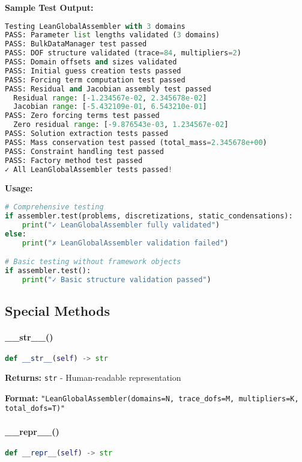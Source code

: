 \textbf{Sample Test Output:}
\begin{lstlisting}[language=Python, caption=Sample Test Output]
Testing LeanGlobalAssembler with 3 domains
PASS: Parameter list lengths validated (3 domains)
PASS: BulkDataManager test passed
PASS: DOF structure validated (trace=84, multipliers=2)
PASS: Domain offsets and sizes validated
PASS: Initial guess creation tests passed
PASS: Forcing term computation test passed
PASS: Residual and Jacobian assembly test passed
  Residual range: [-1.234567e-02, 2.345678e-02]
  Jacobian range: [-5.432109e-01, 6.543210e-01]
PASS: Zero forcing terms test passed
  Zero residual range: [-9.876543e-03, 1.234567e-02]
PASS: Solution extraction tests passed
PASS: Mass conservation test passed (total_mass=2.345678e+00)
PASS: Constraint handling test passed
PASS: Factory method test passed
✓ All LeanGlobalAssembler tests passed!
\end{lstlisting}

\textbf{Usage:}
\begin{lstlisting}[language=Python, caption=Test Usage]
# Comprehensive testing
if assembler.test(problems, discretizations, static_condensations):
    print("✓ LeanGlobalAssembler fully validated")
else:
    print("✗ LeanGlobalAssembler validation failed")

# Basic testing without framework objects
if assembler.test():
    print("✓ Basic structure validation passed")
\end{lstlisting}

\subsection{Special Methods}
\label{subsec:special_methods}

\paragraph{\_\_str\_\_()}\leavevmode
\begin{lstlisting}[language=Python, caption=String Representation Method]
def __str__(self) -> str
\end{lstlisting}

\textbf{Returns:} \texttt{str} - Human-readable representation

\textbf{Format:} \texttt{"LeanGlobalAssembler(domains=N, trace\_dofs=M, multipliers=K, total\_dofs=T)"}

\paragraph{\_\_repr\_\_()}\leavevmode
\begin{lstlisting}[language=Python, caption=Repr Method]
def __repr__(self) -> str
\end{lstlisting}

